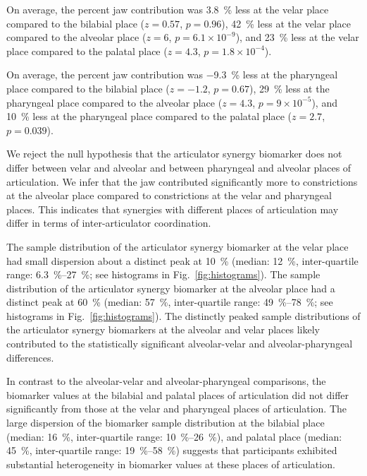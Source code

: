 \documentclass[reprint]{JASAnew}\usepackage[]{graphicx}\usepackage[]{color}
\begin{document}
%
On average, the percent jaw contribution was 
%
%
\SI{3.8}{\percent} 
less at the velar place compared to the bilabial place
($z=0.57$, 
$p=0.96$),
%
%
\SI{42}{\percent} 
less at the velar place compared to the alveolar place
($z=6$, 
$p=\ensuremath{6.1\times 10^{-9}}$), and
%
%
\SI{23}{\percent} 
less at the velar place compared to the palatal place
($z=4.3$, 
$p=\ensuremath{1.8\times 10^{-4}}$).




%
On average, the percent jaw contribution was 
%
%
\SI{-9.3}{\percent} 
less at the pharyngeal place compared to the bilabial place
($z=-1.2$, 
$p=0.67$),
%
%
\SI{29}{\percent} 
less at the pharyngeal place compared to the alveolar place
($z=4.3$, 
$p=\ensuremath{9\times 10^{-5}}$), and
%
%
\SI{10}{\percent} 
less at the pharyngeal place compared to the palatal place
($z=2.7$, 
$p=0.039$).




We reject the null hypothesis that the articulator synergy biomarker does not differ between velar and alveolar and between pharyngeal and alveolar places of articulation. 
%
We infer that the jaw contributed significantly more to constrictions at the alveolar place compared to constrictions at the velar and pharyngeal places.
%
This indicates that synergies with different places of articulation may differ in terms of inter-articulator coordination.




The sample distribution of the articulator synergy biomarker at the velar place had small dispersion about a distinct peak at \SI{10}{\percent} 
%
(median: \SI{12}{\percent}, 
inter-quartile range: \SIrange{6.3}{27}{\percent}; see histograms in Fig.~\ref{fig:histograms}).
%
The sample distribution of the articulator synergy biomarker at the alveolar place had a distinct peak at \SI{60}{\percent}
%
(median: \SI{57}{\percent}, 
inter-quartile range: \SIrange{49}{78}{\percent}; see histograms in Fig.~\ref{fig:histograms}).
%
The distinctly peaked sample distributions of the articulator synergy biomarkers at the alveolar and velar places likely contributed to the statistically significant alveolar-velar and alveolar-pharyngeal differences.



In contrast to the alveolar-velar and alveolar-pharyngeal comparisons, the biomarker values at the bilabial and palatal places of articulation did not differ significantly from those at the velar and pharyngeal places of articulation. 
%
The large dispersion of the biomarker sample distribution at the bilabial place
%
(median: \SI{16}{\percent}, 
inter-quartile range: \SIrange{10}{26}{\percent}), 
%
and palatal place
%
(median: \SI{45}{\percent}, 
inter-quartile range: \SIrange{19}{58}{\percent})
%
suggests that participants exhibited substantial heterogeneity in biomarker values at these places of articulation.  







\end{document}
